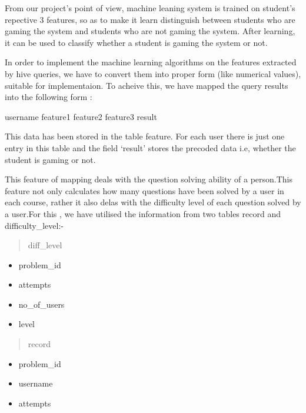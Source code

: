 \documentclass[a4paper,12pt,oneside]{sphinxmanual}
\begin{document}
From our project's point of view, machine leaning system is trained on student's repective 3 features, so as to make it learn distinguish between students who are gaming the system and students who are not gaming the system. After learning, it can be used to classify whether a student is gaming the system or not.

In order to implement the machine learning algorithms on the features extracted by hive queries, we have to convert them into proper form (like numerical values), suitable for implementaion. To acheive this, we have mapped the query results into the following form :

username        feature1        feature2        feature3        result

This data has been stored in the table feature. For each user there is just one entry in this table and the field `result' stores the precoded data i.e, whether the student is gaming or not.

This feature of mapping deals with the question solving ability of a person.This feature not only calculates how many questions have been solved by a user in each course, rather it also delas with the difficulty level of each question solved by a user.For this , we have utilised the information from two tables record and difficulty\_level:-
\begin{quote}\begin{description}
\item[{diff\_level}] \leavevmode
\end{description}\end{quote}
\begin{itemize}
\item {} 
problem\_id

\item {} 
attempts

\item {} 
no\_of\_users

\item {} 
level

\end{itemize}
\begin{quote}\begin{description}
\item[{record}] \leavevmode
\end{description}\end{quote}
\begin{itemize}
\item {} 
problem\_id

\item {} 
username

\item {} 
attempts

\end{itemize}
\end{document}
